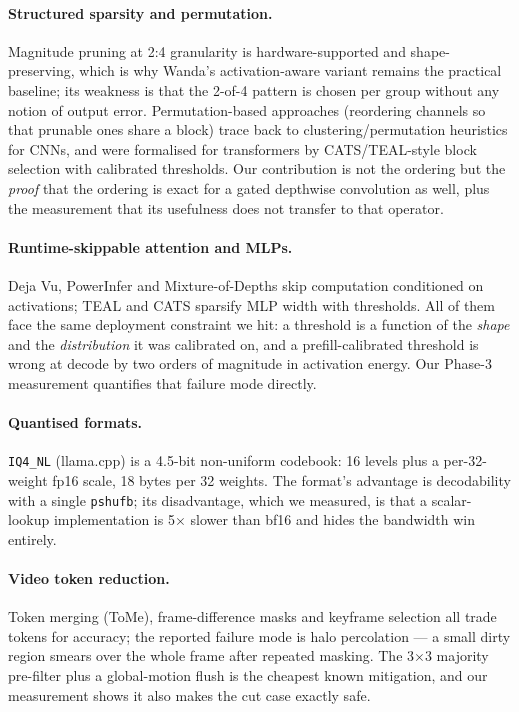 \documentclass[11pt]{article}
\newcommand{\code}[1]{\texttt{\small #1}}
\begin{document}
\paragraph{Structured sparsity and permutation.} Magnitude pruning at 2:4 granularity is
hardware-supported and shape-preserving, which is why Wanda's activation-aware variant
remains the practical baseline; its weakness is that the 2-of-4 pattern is chosen per group
without any notion of output error. Permutation-based approaches (reordering channels so
that prunable ones share a block) trace back to clustering/permutation heuristics for
CNNs, and were formalised for transformers by CATS/TEAL-style block selection with
calibrated thresholds. Our contribution is not the ordering but the \emph{proof} that the
ordering is exact for a gated depthwise convolution as well, plus the measurement that its
usefulness does not transfer to that operator.

\paragraph{Runtime-skippable attention and MLPs.} Deja Vu, PowerInfer and Mixture-of-Depths
skip computation conditioned on activations; TEAL and CATS sparsify MLP width with
thresholds. All of them face the same deployment constraint we hit: a threshold is a
function of the \emph{shape} and the \emph{distribution} it was calibrated on, and a
prefill-calibrated threshold is wrong at decode by two orders of magnitude in activation
energy. Our Phase-3 measurement quantifies that failure mode directly.

\paragraph{Quantised formats.} \code{IQ4\_NL} (llama.cpp) is a 4.5-bit non-uniform
codebook: 16 levels plus a per-32-weight fp16 scale, 18 bytes per 32 weights. The format's
advantage is decodability with a single \code{pshufb}; its disadvantage, which we
measured, is that a scalar-lookup implementation is 5$\times$ slower than bf16 and hides
the bandwidth win entirely.

\paragraph{Video token reduction.} Token merging (ToMe), frame-difference masks and
keyframe selection all trade tokens for accuracy; the reported failure mode is halo
percolation --- a small dirty region smears over the whole frame after repeated masking.
The 3$\times$3 majority pre-filter plus a global-motion flush is the cheapest known
mitigation, and our measurement shows it also makes the cut case exactly safe.
\end{document}
